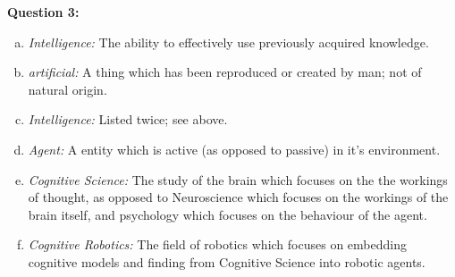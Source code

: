 \textbf{Question 3:}


\begin{enumerate}[a)]
\item \emph{Intelligence: } The ability to effectively use previously acquired knowledge. 
\item \emph{artificial: } A thing which has been reproduced or created by man; not of natural origin.
\item \emph{Intelligence: } Listed twice; see above. 
\item \emph{Agent: } A entity which is active (as opposed to passive) in it's environment. 
\item \emph{Cognitive Science: } The study of the brain which focuses on the the workings of thought, as opposed to Neuroscience which focuses on the workings of the brain itself, and psychology which focuses on the behaviour of the agent.
\item \emph{Cognitive Robotics: } The field of robotics which focuses on embedding cognitive models and finding from Cognitive Science into robotic agents.  
\end{enumerate}

